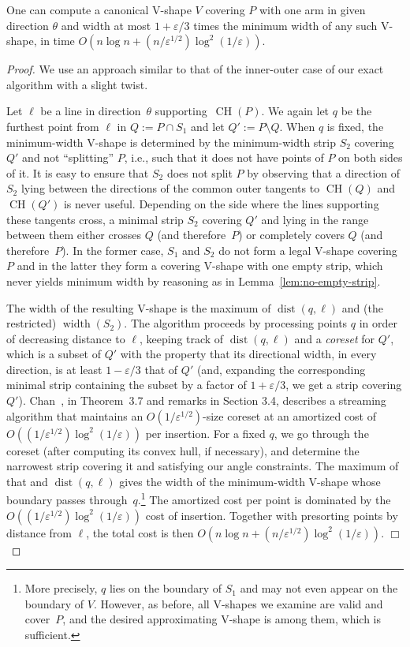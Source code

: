 \documentclass{llncs}
\let\eps\varepsilon
\DeclareMathOperator{\conv}{CH}
\DeclareMathOperator{\dist}{dist}
\DeclareMathOperator{\width}{width}
\begin{document}
\begin{lemma}
  \label{lem:apx-one-direction}
  One can compute a canonical V-shape $V$ covering $P$ with one arm in
  given direction $\theta$ and width at most $1+\eps/3$ times the
  minimum width of any such V-shape, in time $O(n\log n +
  (n/\eps^{1/2})\log^2(1/\eps))$.
\end{lemma}

\begin{proof}
  We use an approach similar to that of the inner-outer case of our
  exact algorithm with a slight twist.  


  Let $\ell$ be a line in direction~$\theta$ supporting~$\conv(P)$.  We
  again let $q$ be the furthest point from $\ell$ in $Q:=P\cap S_1$
  and let $Q':=P \setminus Q$.  When $q$ is fixed, the minimum-width
  V-shape is determined by the minimum-width strip $S_2$ covering $Q'$
  and not ``splitting'' $P$, i.e., such that it does not have points of
  $P$ on both sides of it.  It is easy to ensure that $S_2$ does not
  split $P$ by observing that a direction of $S_2$ lying between the
  directions of the common outer tangents to $\conv(Q)$ and $\conv(Q')$ is
  never useful.  Depending on the side where the lines supporting
  these tangents cross, a minimal strip $S_2$ covering $Q'$ and lying
  in the range between them either crosses $Q$ (and therefore~$P$) or
  completely covers $Q$ (and therefore~$P$).  In the former case,
  $S_1$ and $S_2$ do not form a legal V-shape covering $P$ and in the
  latter they form a covering V-shape with one empty strip, which 
never yields minimum width by reasoning as in Lemma~\ref{lem:no-empty-strip}. 


  The width of the resulting V-shape is the maximum of $\dist(q,\ell)$
  and (the restricted) $\width(S_2)$.  The algorithm proceeds by processing points $q$
  in order of decreasing distance to $\ell$, keeping track of
  $\dist(q,\ell)$ and a \emph{coreset} for $Q'$, which is a subset of
  $Q'$ with the property that its directional width, in every
  direction, is at least $1-\eps/3$ that of $Q'$ (and, expanding the
  corresponding minimal strip containing the subset by
  a factor of $1+\eps/3$, we get a strip covering $Q'$).  Chan~\cite{chan04}, in
  Theorem~3.7 and remarks in Section 3.4, describes a streaming
  algorithm that maintains an $O(1/\eps^{1/2})$-size coreset at an
  amortized cost of $O((1/\eps^{1/2})\log^2(1/\eps))$ per insertion.
  For a fixed $q$, we go through the coreset (after computing its
  convex hull, if necessary), and determine the narrowest strip
  covering it and satisfying our angle constraints.  The maximum of
  that and $\dist(q,\ell)$ gives the width of the minimum-width
  V-shape whose boundary passes through~$q$.\footnote{More precisely, $q$ lies on the boundary of $S_1$ and may not even appear
    on the boundary of $V$. However, as before, all V-shapes we
    examine are valid and cover~$P$, and the desired approximating
    V-shape is among them, which is sufficient.}
  The amortized cost per
  point is dominated by the $O((1/\eps^{1/2})\log^2(1/\eps))$ cost of
  insertion.  Together with presorting points by distance from $\ell$,
  the total cost is then $O(n\log n + (n/\eps^{1/2})\log^2(1/\eps))$. \hfill $\Box$
\end{proof}
\end{document}
